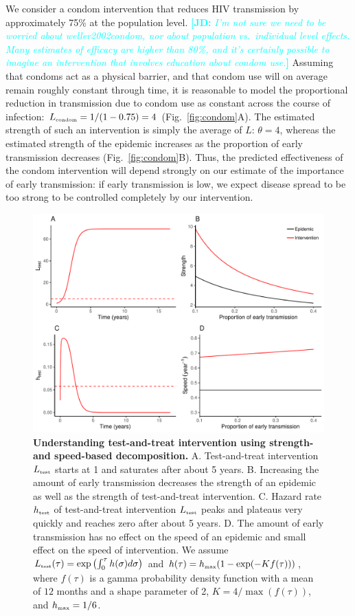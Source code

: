 \documentclass[12pt]{article}\usepackage[]{graphicx}\usepackage[]{color}
\newcommand{\comment}[3]{\textcolor{#1}{\textbf{[#2: }\textit{#3}\textbf{]}}}
\newcommand{\jd}[1]{\comment{cyan}{JD}{#1}}
\newcommand{\tsub}[2]{#1_{{\textrm{\tiny #2}}}}
\newcommand{\figref}[1]{Fig.~\ref{fig:#1}}
\newcommand{\figlab}[1]{\label{fig:#1}}
\begin{document}
We consider a condom intervention that reduces HIV transmission by approximately 75\% at the population level. \jd{I'm not sure we need to be worried about weller2002condom, nor about population vs.~individual level effects. Many estimates of efficacy are higher than 80\%, and it's certainly possible to imagine an intervention that involves education about condom use.}
Assuming that condoms act as a physical barrier, and that condom use will on average remain roughly constant through time, it is reasonable to model the proportional reduction in transmission due to condom use as constant across the course of infection: $\tsub{L}{condom} = 1/(1-0.75) = 4$  (\figref{condom}A).
The estimated strength of such an intervention is simply the average of $L$: $\theta=4$, whereas the estimated strength of the epidemic increases as the proportion of early transmission decreases (\figref{condom}B).
Thus, the predicted effectiveness of the condom intervention will depend strongly on our estimate of the importance of early transmission: if early transmission is low, we expect disease spread to be too strong to be controlled completely by our intervention. 

\begin{figure}[!t]
\includegraphics[width=\textwidth]{../figure/test_and_treat.pdf}
\caption{
\textbf{Understanding test-and-treat intervention using strength- and speed-based decomposition.}
A. Test-and-treat intervention $\tsub{L}{test}$ starts at 1 and saturates after about 5 years.
B. Increasing the amount of early transmission decreases the strength of an epidemic as well as the strength of test-and-treat intervention.
C. Hazard rate $\tsub{h}{test}$ of test-and-treat intervention $\tsub{L}{test}$ peaks and plateaus very quickly and reaches zero after about 5 years.
D. The amount of early transmission has no effect on the speed of an epidemic and small effect on the speed of intervention.
We assume $\tsub{L}{test}(\tau) = \exp\left(\int_0^\tau h(\sigma) d\sigma \right)$ and $h(\tau) = \tsub{h}{max} (1 - \exp(- K f(\tau)))$, where $f(\tau)$ is a gamma probability density function with a mean of $12$ months and a shape parameter of 2, $K = 4/\max(f(\tau))$, and $\tsub{h}{max} = 1/6$.
}
\figlab{test}
\end{figure}
\end{document}
